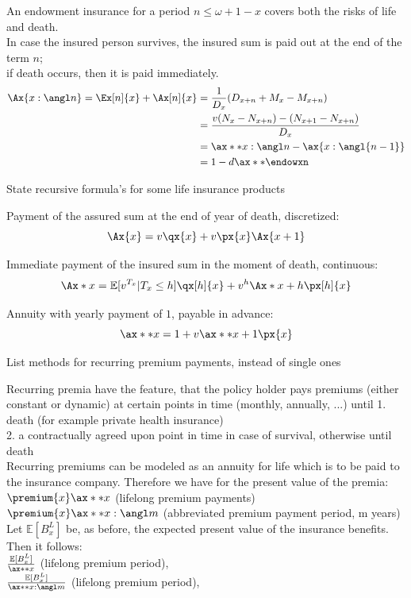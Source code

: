 \documentclass[11pt,a4paper,twoside]{article}
\begin{document}
An endowment insurance for a period \( n \leq \omega + 1 - x \) covers both the risks of life and
death.\\
In case the insured person survives, the insured sum is paid out at the end of the term \( n \);\\
if death occurs, then it is paid immediately.
\begin{align*}
  \Ax{x:\angl n} = \Ex[n]{x} + \Ax[n]{x} &= \frac{1}{D_x}(D_{x+n} + M_x - M_{x+n}) \\
                                         &= \frac{v(N_x - N_{x+n}) - (N_{x+1} - N_{x+n})}{D_x}  \\
                                         &= \ax**{x:\angl n} - \ax{x:\angl{n-1}}  \\
                                         &= 1 - d \ax**{\endowxn}
\end{align*}


State recursive formula's for some life insurance products

Payment of the assured sum at the end of year of death, discretized:
\[ \Ax{x} = v\qx{x} + v\px{x} \Ax{x+1} \]

Immediate payment of the insured sum in the moment of death, continuous:
\[ \Ax*{x} = \mathbb{E}[v^{T_x}| T_x \leq h] \qx[h]{x} + v^h \Ax*{x+h} \px[h]{x} \]

Annuity with yearly payment of \( 1 \), payable in advance:
\[ \ax**{x} = 1 + v \ax**{x+1} \px{x} \]


List methods for recurring premium payments, instead of single ones

Recurring premia have the feature, that the policy holder pays premiums (either constant or dynamic) 
at certain points in time (monthly, annually, ...) until
1. death (for example private health insurance) \\
2. a contractually agreed upon point in time in case of survival, otherwise until death \\

Recurring premiums can be modeled as an annuity for life which is to be paid to the 
insurance company. Therefore we have for the present value of the premia: \\
\( \premium{x} \ax**{x} \) (lifelong premium payments) \\
\( \premium{x} \ax**{x:\angl m} \) (abbreviated premium payment period, m years) \\
Let \( \mathbb{E}[B_x^L] \) be, as before, the expected present value of the insurance benefits. \\
Then it follows: \\
\( \frac{\mathbb{E}[B^L_x]}{\ax**{x}} \) (lifelong premium period), \\
\( \frac{\mathbb{E}[B^L_x]}{\ax**{x: \angl m}} \) (lifelong premium period), \\
\end{document}
